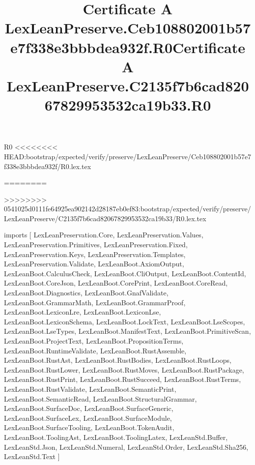 \begin{lexlean}{R0}
<<<<<<<< HEAD:bootstrap/expected/verify/preserve/LexLeanPreserve/Ceb108802001b57e7f338e3bbbdea932f/R0.lex.tex
\title{Certificate A LexLeanPreserve.Ceb108802001b57e7f338e3bbbdea932f.R0}
========
\title{Certificate A LexLeanPreserve.C2135f7b6cad82067829953532ca19b33.R0}
>>>>>>>> 0541025d0111fe64925ea902142d28187eb0ef83:bootstrap/expected/verify/preserve/LexLeanPreserve/C2135f7b6cad82067829953532ca19b33/R0.lex.tex
\begin{coremodule}
imports [
  LexLeanPreservation.Core,
  LexLeanPreservation.Values,
  LexLeanPreservation.Primitives,
  LexLeanPreservation.Fixed,
  LexLeanPreservation.Keys,
  LexLeanPreservation.Templates,
  LexLeanPreservation.Validate,
  LexLeanBoot.AxiomOutput,
  LexLeanBoot.CalculusCheck,
  LexLeanBoot.CliOutput,
  LexLeanBoot.ContentId,
  LexLeanBoot.CoreJson,
  LexLeanBoot.CorePrint,
  LexLeanBoot.CoreRead,
  LexLeanBoot.Diagnostics,
  LexLeanBoot.GnafValidate,
  LexLeanBoot.GrammarMath,
  LexLeanBoot.GrammarProof,
  LexLeanBoot.LexiconLre,
  LexLeanBoot.LexiconLse,
  LexLeanBoot.LexiconSchema,
  LexLeanBoot.LockText,
  LexLeanBoot.LseScopes,
  LexLeanBoot.LseTypes,
  LexLeanBoot.ManifestText,
  LexLeanBoot.PrimitiveScan,
  LexLeanBoot.ProjectText,
  LexLeanBoot.PropositionTerms,
  LexLeanBoot.RuntimeValidate,
  LexLeanBoot.RustAssemble,
  LexLeanBoot.RustAst,
  LexLeanBoot.RustBodies,
  LexLeanBoot.RustLoops,
  LexLeanBoot.RustLower,
  LexLeanBoot.RustMoves,
  LexLeanBoot.RustPackage,
  LexLeanBoot.RustPrint,
  LexLeanBoot.RustSucceed,
  LexLeanBoot.RustTerms,
  LexLeanBoot.RustValidate,
  LexLeanBoot.SemanticPrint,
  LexLeanBoot.SemanticRead,
  LexLeanBoot.StructuralGrammar,
  LexLeanBoot.SurfaceDoc,
  LexLeanBoot.SurfaceGeneric,
  LexLeanBoot.SurfaceLex,
  LexLeanBoot.SurfaceModule,
  LexLeanBoot.SurfaceTooling,
  LexLeanBoot.TokenAudit,
  LexLeanBoot.ToolingAst,
  LexLeanBoot.ToolingLatex,
  LexLeanStd.Buffer,
  LexLeanStd.Json,
  LexLeanStd.Numeral,
  LexLeanStd.Order,
  LexLeanStd.Sha256,
  LexLeanStd.Text
]


\end{coremodule}
\end{lexlean}
